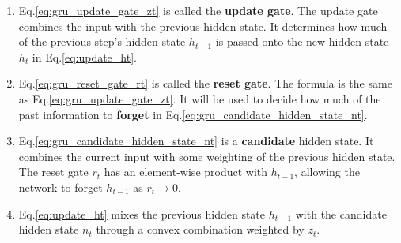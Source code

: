 \documentclass[11pt]{article}
\numberwithin{equation}{section}
\begin{document}
\begin{enumerate}[noitemsep]
\item Eq.\eqref{eq:gru_update_gate_zt} is called the \textbf{update gate}. The update gate combines the input with the previous hidden state. It determines how much of the previous step's hidden state $h_{t-1}$ is passed onto the new hidden state $h_{t}$ in Eq.\eqref{eq:update_ht}.
\item Eq.\eqref{eq:gru_reset_gate_rt} is called the \textbf{reset gate}. The formula is the same as Eq.\eqref{eq:gru_update_gate_zt}. It will be used to decide how much of the past information to \textbf{forget} in Eq.\eqref{eq:gru_candidate_hidden_state_nt}.
\item Eq.\eqref{eq:gru_candidate_hidden_state_nt} is a \textbf{candidate} hidden state. It combines the current input with some weighting of the previous hidden state. The reset gate $r_t$ has an element-wise product with $h_{t-1}$, allowing the network to forget $h_{t-1}$ as $r_t \rightarrow 0$. 
\item Eq.\eqref{eq:update_ht} mixes the previous hidden state $h_{t-1}$ with the candidate hidden state $n_t$ through a convex combination weighted by $z_t$.
\end{enumerate}

\cite{bahdanau14}


\newpage
 
\end{document}
